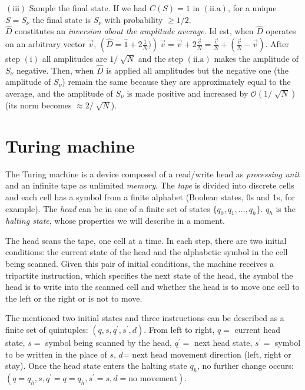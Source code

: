 \documentclass[11pt]{article}
\numberwithin{equation}{section} %
\numberwithin{figure}{section} %
\begin{document}
\begin{appendices}
\noindent $(\textrm{iii})$ Sample the final state. If we had $C(S)=1$ in $(\textrm{ii.a})$, for a unique $S=S_\nu$ the final state is $S_\nu$ with probability $\geq 1/2$.\\


$\hat{D}$ constitutes an \emph{inversion about the amplitude average}. Id est, when $\hat{D}$ operates on an arbitrary vector $\vec{v}$, $\left( \hat{D}=\hat{1}+2\frac{1}{N})\right)\,\vec{v}=\vec{v}+2\frac{\vec{v}}{N}=\frac{\vec{v}}{N}+\left(\frac{\vec{v}}{N}-\vec{v}\right)$. After step $(\textrm{i})$ all amplitudes are $1/\sqrt[]{N}$ and the step $(\textrm{ii.a})$ makes the amplitude of $S_\nu$ negative. Then, when $\hat{D}$ is applied all amplitudes but the negative one (the amplitude of $S_\nu$) remain the same because they are approximately equal to the average, and the amplitude of $S_\nu$ is made positive and increased by $\mathcal{O}(1/\sqrt[]{N})$ (its norm becomes  $\approx 2/\sqrt[]{N}$). $\,\,\,$ \cite[p.~4, Fig.~2]{Grover}


\vspace{1cm}
\section{Turing machine} \label{Turing machine}
The Turing machine is a device composed of a read/write head as \emph{processing unit} and an infinite tape as unlimited \emph{memory}. The \emph{tape} is divided into discrete cells and each cell has a symbol from a finite alphabet (Boolean states, 0s and 1s, for example). The \emph{head} can be in one of a finite set of states $\{q_0,q_1,...,q_h\}$. $q_h$ is the \emph{halting state}, whose properties we will describe in a moment.

The head scans the tape, one cell at a time. In each step, there are two initial conditions: the current state of the head and the alphabetic symbol in the cell being scanned. Given this pair of initial conditions, the machine receives a tripartite instruction, which specifies the next state of the head, the symbol the head is to write into the scanned cell and whether the head is to move one cell to the left or the right or is not to move.

The mentioned two initial states and three instructions can be described as a finite set of quintuples: $(q,s,q^\prime,s^\prime,d)$. From left to right, $q=$ current head state, $s=$ symbol being scanned by the head, $q^\prime=$ next head state, $s^\prime=$ symbol to be written in the place of $s$, $d$= next head movement direction (left, right or stay). Once the head state enters the halting state $q_h$, no further change occurs: $(q=q_h,s,q^\prime=q=q_h,s^\prime=s,d=\textrm{no movement})$.


\end{appendices}
\end{document}
